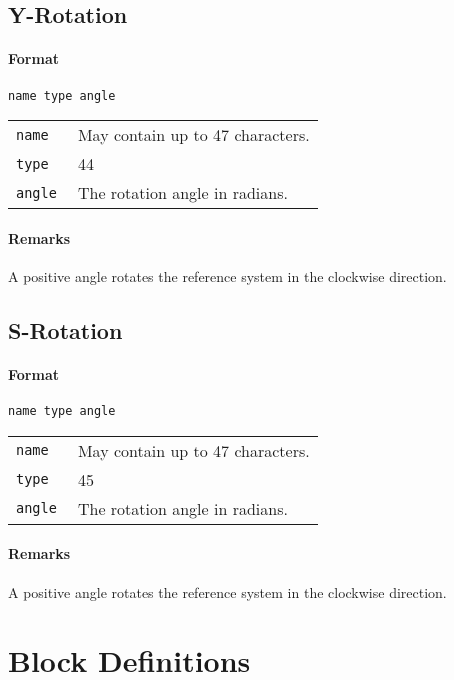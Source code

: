 \subsection{Y-Rotation} \label{y-rotation}

\paragraph{Format} \texttt{name type angle}

\bigskip
\begin{tabular}{@{}lp{0.8\linewidth}}
    \texttt{name}  & May contain up to 47 characters. \\
    \texttt{type}  & 44 \\
    \texttt{angle} & The rotation angle in radians.  
\end{tabular}
\paragraph{Remarks}
A positive angle rotates the reference system in the clockwise direction.
\subsection{S-Rotation} \label{s-rotation}

\paragraph{Format} \texttt{name type angle}

\bigskip
\begin{tabular}{@{}lp{0.8\linewidth}}
    \texttt{name}  & May contain up to 47 characters. \\
    \texttt{type}  & 45 \\
    \texttt{angle} & The rotation angle in radians.  
\end{tabular}
\paragraph{Remarks}
A positive angle rotates the reference system in the clockwise direction.
\section{Block Definitions} \label{BloDef}

